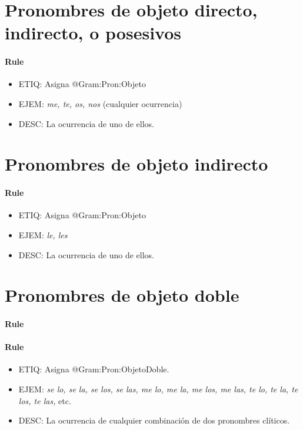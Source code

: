 \documentclass[11pt]{report}
\begin{document}
\section{Pronombres de objeto directo, indirecto, o posesivos}
\paragraph*{Rule}
\begin{itemize}
\item ETIQ: Asigna @Gram:Pron:Objeto
\item EJEM: \emph{me, te, os, nos} (cualquier ocurrencia)
\item DESC: La ocurrencia de uno de ellos.
\end{itemize}

\section{Pronombres de objeto indirecto}
\paragraph*{Rule}
\begin{itemize}
\item ETIQ: Asigna @Gram:Pron:Objeto
\item EJEM: \emph{le, les}
\item DESC: La ocurrencia de uno de ellos.
\end{itemize}

\section{Pronombres de objeto doble}
\paragraph*{Rule}
\paragraph*{Rule}
\begin{itemize}
\item ETIQ: Asigna @Gram:Pron:ObjetoDoble.
\item EJEM: \emph{se lo, se la, se los, se las, me lo, me la, me los, me las, te lo, te la, te los, te las,} etc.
\item DESC: La ocurrencia de cualquier combinación de dos pronombres clíticos.
\end{itemize}
\end{document}
